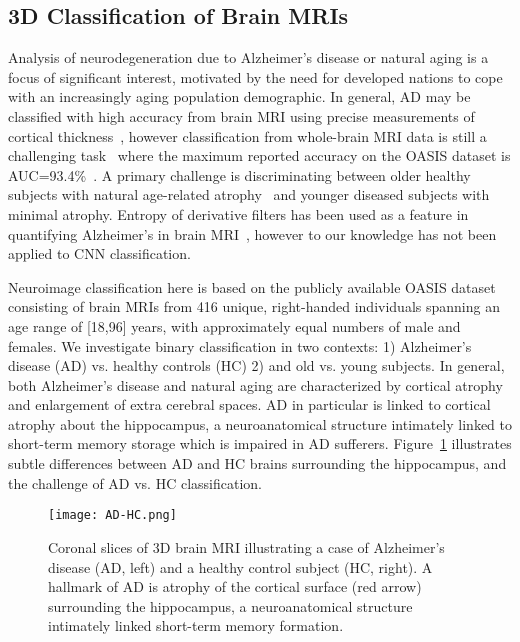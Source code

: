 \documentclass[10pt,onecolumn]{article}
\begin{document}
\subsection{3D Classification of Brain MRIs}

Analysis of neurodegeneration due to Alzheimer's disease or natural aging is a focus of significant interest, motivated by the need for developed nations to cope with an increasingly aging population demographic. In general, AD may be classified with high accuracy from brain MRI using precise measurements of cortical thickness~\cite{desikan2009automated}, however classification from whole-brain MRI data is still a challenging task~\cite{wachinger2016domain} where the maximum reported accuracy on the OASIS dataset is AUC=93.4\%~\cite{mahmood2013automatic}. A primary challenge is discriminating between older healthy subjects with natural age-related atrophy~\cite{toews2010feature} and younger diseased subjects with minimal atrophy. Entropy of derivative filters has been used as a feature in quantifying Alzheimer's in brain MRI~\cite{chaddad2016local}, however to our knowledge has not been applied to CNN classification. 

Neuroimage classification here is based on the publicly available OASIS dataset~\cite{marcus2007open} consisting of brain MRIs from 416 unique, right-handed individuals spanning an age range of [18,96] years, with approximately equal numbers of male and females. We investigate binary classification in two contexts: 1) Alzheimer's disease (AD) vs. healthy controls (HC) 2) and old vs. young subjects. In general, both Alzheimer's disease and natural aging are characterized by cortical atrophy and enlargement of extra cerebral spaces. AD in particular is linked to cortical atrophy about the hippocampus, a neuroanatomical structure intimately linked to short-term memory storage which is impaired in AD sufferers. Figure~\ref{fig:ad_hc} illustrates subtle differences between AD and HC brains surrounding the hippocampus, and the challenge of AD vs. HC classification. 

\begin{figure}[t]
\begin{center}
\texttt{[image: AD-HC.png]}
\end{center}
   \caption{Coronal slices of 3D brain MRI illustrating a case of Alzheimer's disease (AD, left) and a healthy control subject (HC, right). A hallmark of AD is atrophy of the cortical surface (red arrow) surrounding the hippocampus, a neuroanatomical structure intimately linked short-term memory formation.}
\label{fig:ad_hc}
\end{figure}
\end{document}

